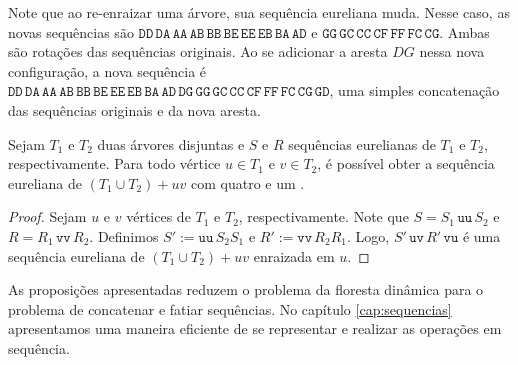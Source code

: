 Note que ao re-enraizar uma árvore, sua sequência eureliana muda. Nesse caso, as novas sequências são $\mathtt{DD\,DA\,AA\,AB\,BB\,BE\,EE\,EB\,BA\,AD}$ e $\mathtt{GG\,GC\,CC\,CF\,FF\,FC\,CG}$. Ambas são rotações das sequências originais. Ao se adicionar a aresta $DG$ nessa nova configuração, a nova sequência é $\mathtt{DD\,DA\,AA\,AB\,BB\,BE\,EE\,EB\,BA\,AD\,DG\,GG\,GC\,CC\,CF\,FF\,FC\,CG\,GD}$, uma simples concatenação das sequências originais e da nova aresta.  

\begin{prop}
Sejam $T_1$ e $T_2$ duas árvores disjuntas e $S$ e $R$ sequências eurelianas de $T_1$ e $T_2$, respectivamente. Para todo vértice $u \in T_1$ e $v \in T_2$, é possível obter a sequência eureliana de $(T_1 \cup T_2) + uv$ com quatro \concatenations e um \splitt. 
\end{prop}
\begin{proof}
Sejam $u$ e $v$ vértices de $T_1$ e $T_2$, respectivamente. Note que $S = S_1\,\mathtt{uu}\,S_2$ e $R = R_1\,\mathtt{vv}\,R_2$. Definimos $S' := \mathtt{uu}\,S_2S_1$ e $R' :=\mathtt{vv}\, R_2R_1$. Logo, $S'\,\mathtt{uv}\,R'\,\mathtt{vu}$ é uma sequência eureliana de $(T_1 \cup T_2) + uv$ enraizada em $u$.
\end{proof}

As proposições apresentadas reduzem o problema da floresta dinâmica para o problema de concatenar e fatiar sequências. No capítulo \ref{cap:sequencias} apresentamos uma maneira eficiente de se representar e realizar as operações em sequência.





